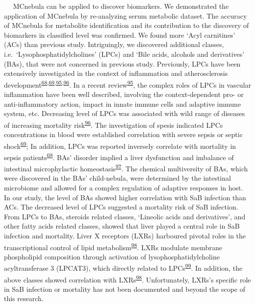    MCnebula can be applied to discover biomarkers. We demonstrated the
application of MCnebula by re-analyzing serum metabolic dataset. The
accuracy of MCnebula for metabolite identification and its contribution
to the discovery of biomarkers in classified level was confirmed. We
found more `Acyl carnitines' (ACs) than previous study. Intriguingly, we
discovered additional classes, i.e.~`Lysophosphatidylcholines' (LPCs)
and `Bile acids, alcohols and derivatives' (BAs), that were not
concerned in previous study. Previously, LPCs have been extensively
investigated in the context of inflammation and atherosclerosis
development\textsuperscript{\protect\hyperlink{ref-2003n}{68},\protect\hyperlink{ref-2014ao}{69},\protect\hyperlink{ref-2020cv}{95},\protect\hyperlink{ref-2016at}{96}}.
In a recent review\textsuperscript{\protect\hyperlink{ref-2020cv}{95}},
the complex roles of LPCs in vascular inflammation have been well
described, involving the context-dependent pro- or anti-inflammatory
action, impact in innate immune cells and adaptive immune system, etc.
Decreasing level of LPCs was associated with wild range of diseases of
increasing mortality
risk\textsuperscript{\protect\hyperlink{ref-2016at}{96}}. The
investigation of spesis indicated LPCs concentrations in blood were
established correlation with severe sepsis or septic
shock\textsuperscript{\protect\hyperlink{ref-2014ao}{69}}; In addition,
LPCs was reported inversely correlate with mortality in sepsis
patients\textsuperscript{\protect\hyperlink{ref-2003n}{68}}. BAs'
disorder implied a liver dysfunction and imbalance of intestinal
microphylactic
homeostasis\textsuperscript{\protect\hyperlink{ref-2021dg}{97}}. The
chemical multiversity of BAs, which were discovered in the BAs'
child-nebula, were determined by the intestinal microbiome and allowed
for a complex regulation of adaptive responses in host. In our study,
the level of BAs showed higher correlation with SaB infection than ACs.
The decreased level of LPCs suggested a mortality risk of SaB infection.
From LPCs to BAs, steroids related classes, `Lineolic acids and
derivatives', and other fatty acids related classes, showed that liver
played a central role in SaB infection and mortality. Liver X receptors
(LXRs) harboured pivotal roles in the transcriptional control of lipid
metabolism\textsuperscript{\protect\hyperlink{ref-2018bd}{98}}. LXRs
modulate membrane phospholipid composition through activation of
lysophosphatidylcholine acyltransferase 3 (LPCAT3), which directly
related to LPCs\textsuperscript{\protect\hyperlink{ref-2021di}{99}}. In
addition, the above classes showed correlation with
LXRs\textsuperscript{\protect\hyperlink{ref-2018bd}{98}}. Unfortunately,
LXRs's specific role in SaB infection or mortality has not been
documented and beyond the scope of this research.

